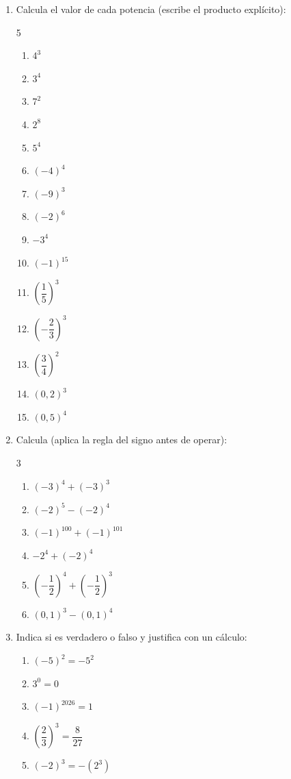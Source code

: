 \documentclass[11pt, letterpaper]{article}
\begin{document}
\begin{enumerate}[label=\textbf{\arabic*.}, leftmargin=*]
  \item Calcula el valor de cada potencia (escribe el producto explícito):
  \begin{multicols}{5}
  \begin{enumerate}[label=\alph*)]
    \item $4^3$
    \item $3^4$
    \item $7^2$
    \item $2^8$
    \item $5^4$
    \item $(-4)^4$
    \item $(-9)^3$
    \item $(-2)^6$
    \item $-3^4$
    \item $(-1)^{15}$
    \item $\left(\dfrac{1}{5}\right)^3$
    \item $\left(-\dfrac{2}{3}\right)^3$
    \item $\left(\dfrac{3}{4}\right)^2$
    \item $(0{,}2)^3$
    \item $(0{,}5)^4$
  \end{enumerate}
  \end{multicols}

  \item Calcula (aplica la regla del signo antes de operar):
  \begin{multicols}{3}
  \begin{enumerate}[label=\alph*)]
    \item $(-3)^4 + (-3)^3$
    \item $(-2)^5 - (-2)^4$
    \item $(-1)^{100} + (-1)^{101}$
    \item $-2^4 + (-2)^4$
    \item $\left(-\dfrac{1}{2}\right)^4 + \left(-\dfrac{1}{2}\right)^3$
    \item $(0{,}1)^3 - (0{,}1)^4$
  \end{enumerate}
  \end{multicols}

  \item Indica si es verdadero o falso y justifica con un cálculo:
  \begin{enumerate}[label=\alph*)]
    \item $(-5)^2 = -5^2$
    \item $3^0 = 0$
    \item $(-1)^{2026} = 1$
    \item $\left(\dfrac{2}{3}\right)^3 = \dfrac{8}{27}$
    \item $(-2)^3 = -(2^3)$
  \end{enumerate}
\end{enumerate}
\end{document}
